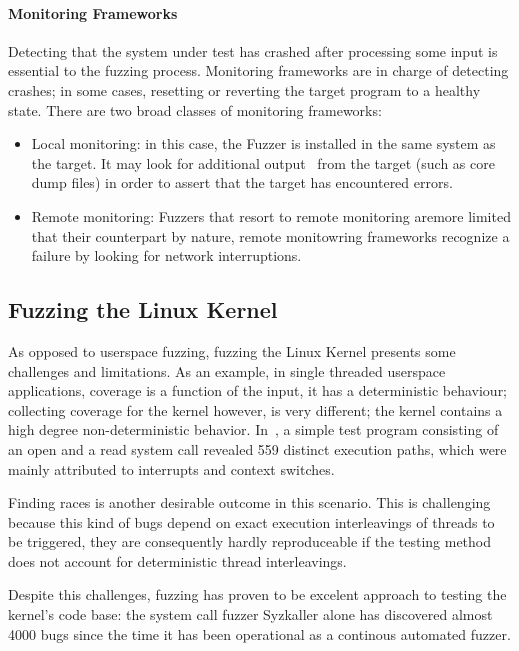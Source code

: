 \paragraph{Monitoring Frameworks}

Detecting that the system under test has crashed after processing some input is essential to the fuzzing process.
Monitoring frameworks are in charge of detecting crashes; in some cases, resetting or reverting the target program to a healthy state.
There are two broad classes of monitoring frameworks\cite{mcnallyFuzzingStateArt2012}:

\begin{itemize}
    \item Local monitoring: in this case, the Fuzzer is installed in the same system as the target. It may look for additional output \
    from the target (such as core dump files) in order to assert that the target has encountered errors.
    \item Remote monitoring: Fuzzers that resort to remote monitoring aremore limited that their counterpart by nature, remote monitowring frameworks recognize a failure by looking for network interruptions.
\end{itemize}

\subsection{Fuzzing the Linux Kernel}\label{ss:fuzzingkernel}

As opposed to userspace fuzzing, fuzzing the Linux Kernel
presents some challenges and limitations. As an example, in single threaded
userspace applications, coverage is a function of the input, it has a
deterministic behaviour; collecting coverage for the kernel however, is
very different;  the kernel contains a high degree
non-deterministic behavior. In~\cite{okechInvestigatingExecutionPath2013}, a
simple test program consisting of an open and a read system call revealed
559 distinct execution paths, which were mainly attributed to interrupts and context switches.

Finding races is another desirable outcome in this scenario. This is
challenging because this kind of bugs depend on exact
execution interleavings of threads to be triggered, they are consequently hardly reproduceable if the testing method does not account for deterministic
thread interleavings.

Despite this challenges, fuzzing has proven to be excelent approach to testing the
kernel's code base: the system call fuzzer Syzkaller alone has discovered
almost  4000 bugs since the time it has been operational as a continous
automated fuzzer\cite{Syzbot}.

